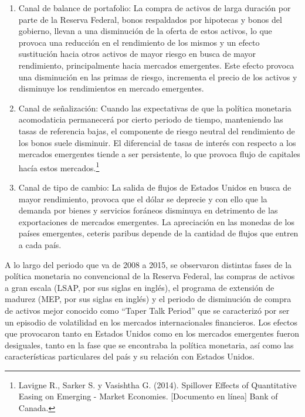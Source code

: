 \documentclass[
  9.5pt,
]{article}
\begin{document}
\begin{enumerate}
\def\labelenumi{\roman{enumi}.}
\item
  Canal de balance de portafolio: La compra de activos de larga duración
  por parte de la Reserva Federal, bonos respaldados por hipotecas y
  bonos del gobierno, llevan a una disminución de la oferta de estos
  activos, lo que provoca una reducción en el rendimiento de los mismos
  y un efecto sustitución hacia otros activos de mayor riesgo en busca
  de mayor rendimiento, principalmente hacia mercados emergentes. Este
  efecto provoca una disminución en las primas de riesgo, incrementa el
  precio de los activos y disminuye los rendimientos en mercado
  emergentes.
\item
  Canal de señalización: Cuando las expectativas de que la política
  monetaria acomodaticia permanecerá por cierto periodo de tiempo,
  manteniendo las tasas de referencia bajas, el componente de riesgo
  neutral del rendimiento de los bonos suele disminuir. El diferencial
  de tasas de interés con respecto a los mercados emergentes tiende a
  ser persistente, lo que provoca flujo de capitales hacía estos
  mercados.\footnote{Lavigne R., Sarker S. y Vasishtha G. (2014). Spillover Effects of Quantitative Easing on Emerging - Market Economies. [Documento en línea] Bank of Canada.}
\item
  Canal de tipo de cambio: La salida de flujos de Estados Unidos en
  busca de mayor rendimiento, provoca que el dólar se deprecie y con
  ello que la demanda por bienes y servicios foráneos disminuya en
  detrimento de las exportaciones de mercados emergentes. La apreciación
  en las monedas de los países emergentes, ceteris paribus depende de la
  cantidad de flujos que entren a cada país.
\end{enumerate}

A lo largo del periodo que va de 2008 a 2015, se observaron distintas
fases de la política monetaria no convencional de la Reserva Federal,
las compras de activos a gran escala (LSAP, por sus siglas en inglés),
el programa de extensión de madurez (MEP, por sus siglas en inglés) y el
periodo de disminución de compra de activos mejor conocido como ``Taper
Talk Period'' que se caracterizó por ser un episodio de volatilidad en
los mercados internacionales financieros. Los efectos que provocaron
tanto en Estados Unidos como en los mercados emergentes fueron
desiguales, tanto en la fase que se encontraba la política monetaria,
así como las características particulares del país y su relación con
Estados Unidos.
\end{document}
